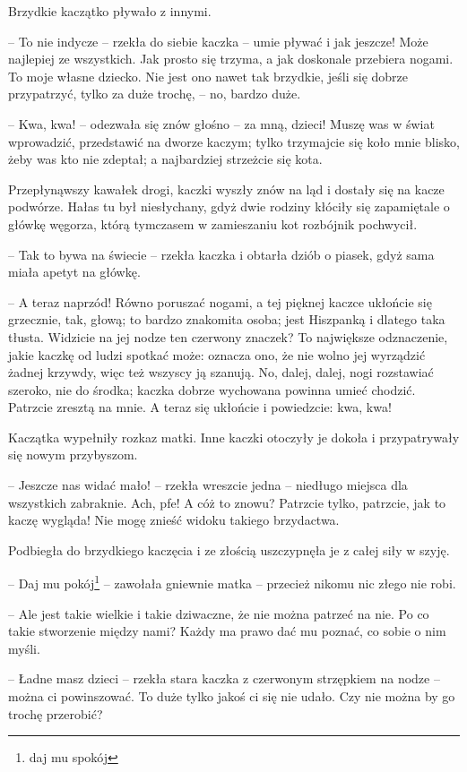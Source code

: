 \documentclass{book}
\begin{document}
Brzydkie kaczątko pływało z innymi.

-- To nie indycze -- rzekła do siebie kaczka -- umie pływać i jak jeszcze! Może najlepiej ze wszystkich. Jak prosto się trzyma, a jak doskonale przebiera nogami. To moje własne dziecko. Nie jest ono nawet tak brzydkie, jeśli się dobrze przypatrzyć, tylko za duże trochę, -- no, bardzo duże.

-- Kwa, kwa! -- odezwała się znów głośno -- za mną, dzieci! Muszę was w świat wprowadzić, przedstawić na 
dworze kaczym; tylko trzymajcie się koło mnie blisko, żeby was kto nie zdeptał; a najbardziej strzeżcie się kota.

Przepłynąwszy kawałek drogi, kaczki wyszły znów na ląd i dostały się na kacze podwórze. Hałas tu był niesłychany, gdyż dwie rodziny kłóciły się zapamiętale o główkę węgorza, którą tymczasem w zamieszaniu kot rozbójnik pochwycił.

-- Tak to bywa na świecie -- rzekła kaczka i obtarła dziób o piasek, gdyż sama miała apetyt na główkę.

-- A teraz naprzód! Równo poruszać nogami, a tej pięknej kaczce ukłońcie się grzecznie, tak, głową; to bardzo znakomita osoba; jest Hiszpanką i dlatego taka tłusta. Widzicie na jej nodze ten czerwony znaczek? To największe odznaczenie, jakie kaczkę od ludzi spotkać może: oznacza ono, że nie wolno jej wyrządzić żadnej krzywdy, więc też wszyscy ją szanują. No, dalej, dalej, nogi rozstawiać szeroko, nie do środka; kaczka dobrze wychowana powinna umieć chodzić. Patrzcie zresztą na mnie. A teraz się ukłońcie i powiedzcie: kwa, kwa!

Kaczątka wypełniły rozkaz matki. Inne kaczki otoczyły je dokoła i przypatrywały się nowym przybyszom.

-- Jeszcze nas widać mało! -- rzekła wreszcie jedna -- niedługo miejsca dla wszystkich zabraknie. Ach, pfe! A cóż to znowu? Patrzcie tylko, patrzcie, jak to kaczę wygląda! Nie mogę znieść widoku takiego brzydactwa.

Podbiegła do brzydkiego kaczęcia i ze złością uszczypnęła je z całej siły w szyję.

-- Daj mu  pokój\footnote{daj mu spokój} -- zawołała gniewnie matka -- przecież nikomu nic złego nie robi.

-- Ale jest takie wielkie i takie dziwaczne, że nie można patrzeć na nie. Po co takie stworzenie między nami? Każdy ma prawo dać mu poznać, co sobie o nim myśli.

-- Ładne masz dzieci -- rzekła stara kaczka z czerwonym strzępkiem na nodze -- można ci powinszować. To duże tylko jakoś ci się nie udało. Czy nie można by go trochę przerobić?
\end{document}
